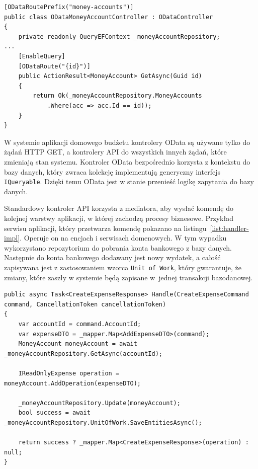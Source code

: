 {\belowcaptionskip=-10pt
\begin{lstlisting}[label=list:odata-ctrl-1,
    caption=Przykład implementacji kontrolera OData]
[ODataRoutePrefix("money-accounts")]
public class ODataMoneyAccountController : ODataController
{
    private readonly QueryEFContext _moneyAccountRepository;
...
    [EnableQuery]
    [ODataRoute("{id}")]
    public ActionResult<MoneyAccount> GetAsync(Guid id)
    {
        return Ok(_moneyAccountRepository.MoneyAccounts
            .Where(acc => acc.Id == id));
    }
}
\end{lstlisting}
}

W systemie aplikacji domowego budżetu kontrolery OData są używane tylko do żądań HTTP GET, a kontrolery API do wszystkich innych żądań, które zmieniają stan systemu.
Kontroler OData bezpośrednio korzysta z kontekstu do bazy danych, który zwraca kolekcję implementują generyczny interfejs \texttt{IQueryable}. Dzięki temu OData jest w stanie przenieść logikę zapytania do bazy danych.

Standardowy kontroler API korzysta z mediatora, aby wysłać komendę do kolejnej warstwy aplikacji, w której zachodzą procesy biznesowe. Przykład serwisu aplikacji, który przetwarza komendę pokazano na listingu~\ref{list:handler-impl}. Operuje on na encjach i serwisach domenowych. W tym wypadku wykorzystano repozytorium do pobrania konta bankowego z bazy danych. Następnie do konta bankowego dodawany jest nowy wydatek, a całość zapisywana jest z zastosowaniem wzorca \texttt{Unit of Work}, który gwarantuje, że zmiany, które zaszły w systemie będą zapisane w~jednej transakcji bazodanowej. 

{\belowcaptionskip=-10pt
\begin{lstlisting}[label=list:handler-impl,
    caption=Przykład implementacji handlera aplikacji]
public async Task<CreateExpenseResponse> Handle(CreateExpenseCommand command, CancellationToken cancellationToken)
{
    var accountId = command.AccountId;
    var expenseDTO = _mapper.Map<AddExpenseDTO>(command);
    MoneyAccount moneyAccount = await _moneyAccountRepository.GetAsync(accountId);

    IReadOnlyExpense operation = moneyAccount.AddOperation(expenseDTO);

    _moneyAccountRepository.Update(moneyAccount);
    bool success = await _moneyAccountRepository.UnitOfWork.SaveEntitiesAsync();

    return success ? _mapper.Map<CreateExpenseResponse>(operation) : null;
}
\end{lstlisting}
}

